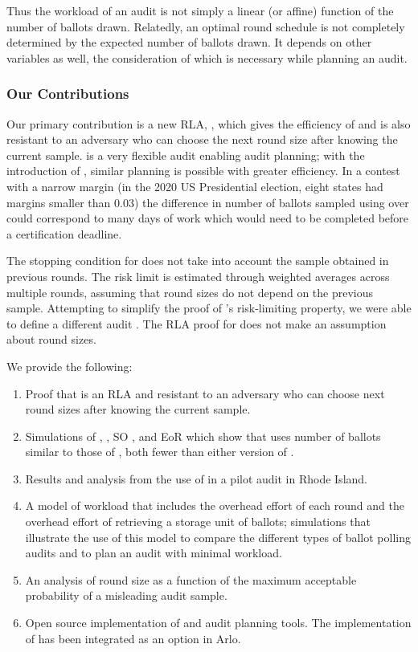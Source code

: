Thus the workload of an audit is not simply a linear (or affine) function of the number of ballots drawn. Relatedly, an optimal round schedule is not completely determined by the expected number of ballots drawn. It depends on other variables as well, the consideration of which is necessary while planning an audit. 

\subsubsection{Our Contributions}
Our primary contribution is a new RLA, \Providence, which gives the efficiency of \Minerva and is also resistant to an adversary who can choose the next round size after knowing the current sample. 
\BRAVO is a very flexible audit enabling audit planning; with the introduction of \Providence, similar planning is possible with greater efficiency. In a contest with a narrow margin (in the 2020 US Presidential election, eight states had margins smaller than 0.03) the difference in number of ballots sampled using \Providence over \BRAVO could correspond to many days of work which would need to be completed before a certification deadline.

The stopping condition for \Minerva does not take into account the sample obtained in previous rounds. The risk limit is estimated through weighted averages across multiple rounds, assuming that round sizes do not depend on the previous sample. 
Attempting to simplify the proof of \Minerva's risk-limiting property, we were able to define a different audit \Providence. The RLA proof for \Providence does not make an assumption about round sizes.  

We provide the following:
\begin{enumerate}
\item Proof that \Providence is an RLA and resistant to an adversary who can choose next round sizes after knowing the current sample.
\item Simulations of \Providence, \Minerva, SO \BRAVO, and EoR \BRAVO which show that \Providence uses number of ballots similar to those of \Minerva, both fewer than either version of \BRAVO.
\item Results and analysis from the use of \Providence in a pilot audit in Rhode Island.
\item A model of workload that includes the overhead effort of each round and the overhead effort of retrieving a storage unit of ballots; simulations that illustrate the use of this model to compare the different types of ballot polling audits and to plan an audit with minimal workload.
\item An analysis of round size as a function of the maximum acceptable probability of a misleading audit sample.
\item Open source implementation of \Providence and audit planning tools. The implementation of \Providence has been integrated as an option in Arlo. 
\end{enumerate}

